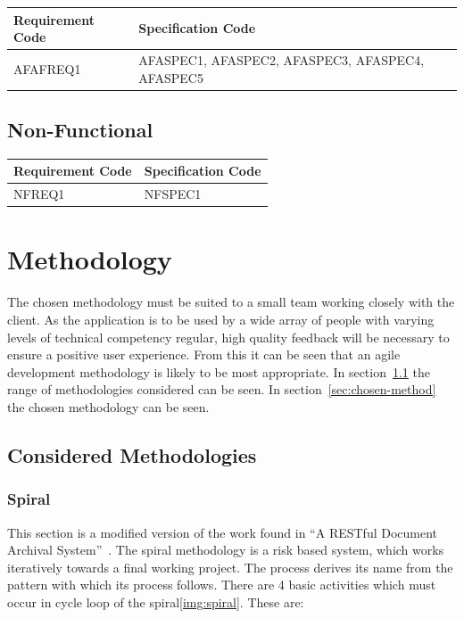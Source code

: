 \documentclass[11pt,a4paper]{article}
\begin{document}
\begin{longtable}{|p{2.7cm}|p{10cm}|}
\hline
\textbf{Requirement Code} & \textbf{Specification Code} \\

\hline \hline AFAFREQ1 & AFASPEC1, AFASPEC2, AFASPEC3, AFASPEC4, AFASPEC5  \\
\hline 
\end{longtable}


\subsection{Non-Functional}

\begin{longtable}{|p{2.7cm}|p{10cm}|}
\hline
\textbf{Requirement Code} & \textbf{Specification Code} \\

\hline \hline NFREQ1 & NFSPEC1\\
\hline 
\end{longtable}

\section{Methodology}
\label{sec:methodologies}
The chosen methodology must be suited to a small team working closely with the client. As the application is to be used by a wide array of people with varying levels of technical competency regular, high quality feedback will be necessary to ensure a positive user experience. From this it can be seen that an agile development methodology is likely to be most appropriate. In section~\ref{sec:considered-methods} the range of methodologies considered can be seen. In section~\ref{sec:chosen-method} the chosen methodology can be seen.

\subsection{Considered Methodologies}
\label{sec:considered-methods}
\subsubsection{Spiral}
This section is a modified version of the work found in ``A RESTful Document Archival System''~\cite{restWeb}. The spiral methodology is a risk based system, which works iteratively towards a final working project. The process derives its name from the pattern with which its process follows. There are 4 basic activities which must occur in cycle loop of the spiral\ref{img:spiral}. These are:
\end{document}
